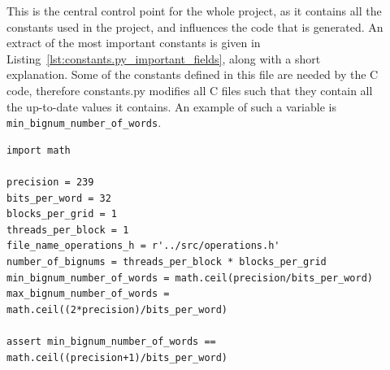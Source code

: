 \documentclass[10pt, a4paper]{report}
\begin{document}
\begin{description}
\item[]
This is the central control point for the whole project, as it contains all the
constants used in the project, and influences the code that is generated.
An extract of the most important constants is given in
Listing~\ref{lst:constants.py_important_fields}, along with a short explanation.
Some of the constants defined in this file are needed by the C code, therefore
constants.py modifies all C files such that they contain all the up-to-date
values it contains.
An example of such a variable is \verb+min_bignum_number_of_words+.

\begin{lstlisting}
import math

precision = 239
bits_per_word = 32
blocks_per_grid = 1
threads_per_block = 1
file_name_operations_h = r'../src/operations.h'
number_of_bignums = threads_per_block * blocks_per_grid
min_bignum_number_of_words = math.ceil(precision/bits_per_word)
max_bignum_number_of_words = math.ceil((2*precision)/bits_per_word)

assert min_bignum_number_of_words == math.ceil((precision+1)/bits_per_word)
\end{lstlisting}


\end{description}
\end{document}
